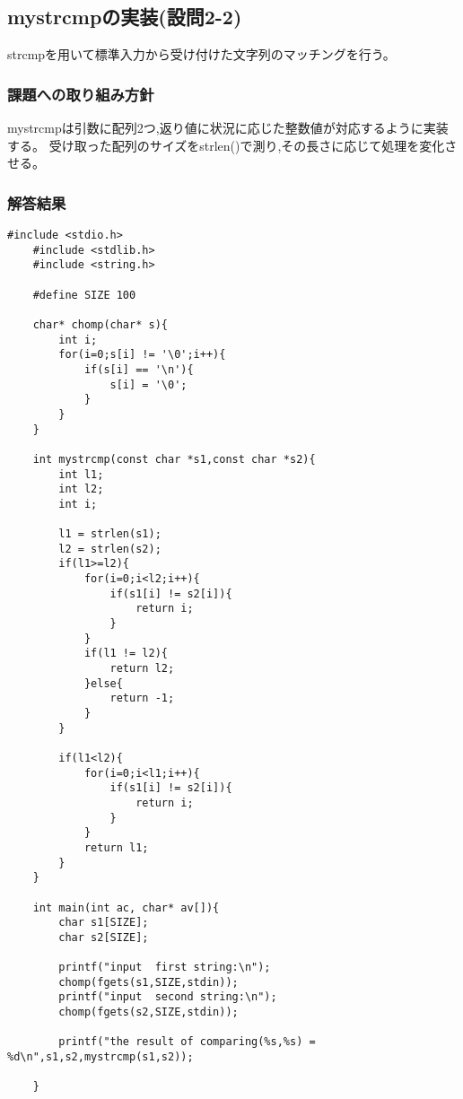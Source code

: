 \documentclass[fontsize = 10pt, paper= a4,twocolumn,column_gap=3zw]{jlreq}
\begin{document}
\subsection{mystrcmpの実装(設問2-2)}
strcmpを用いて標準入力から受け付けた文字列のマッチングを行う。
\subsubsection{課題への取り組み方針}
mystrcmpは引数に配列2つ,返り値に状況に応じた整数値が対応するように実装する。
受け取った配列のサイズをstrlen()で測り,その長さに応じて処理を変化させる。
\subsubsection{解答結果}

\begin{lstlisting}[basicstyle=\ttfamily\footnotesize, frame=single, caption=s2212022-2-2.c,label=s2212022-2-2.c]
    #include <stdio.h>
    #include <stdlib.h>
    #include <string.h>
    
    #define SIZE 100
    
    char* chomp(char* s){
        int i;
        for(i=0;s[i] != '\0';i++){
            if(s[i] == '\n'){
                s[i] = '\0';
            }
        }
    }
    
    int mystrcmp(const char *s1,const char *s2){
        int l1;
        int l2;
        int i;
    
        l1 = strlen(s1);
        l2 = strlen(s2);
        if(l1>=l2){
            for(i=0;i<l2;i++){
                if(s1[i] != s2[i]){
                    return i;
                }
            }
            if(l1 != l2){
                return l2;
            }else{
                return -1;
            }
        }
    
        if(l1<l2){
            for(i=0;i<l1;i++){
                if(s1[i] != s2[i]){
                    return i;
                }
            }
            return l1;
        }
    }
    
    int main(int ac, char* av[]){
        char s1[SIZE];
        char s2[SIZE];
    
        printf("input  first string:\n");
        chomp(fgets(s1,SIZE,stdin));
        printf("input  second string:\n");
        chomp(fgets(s2,SIZE,stdin));
    
        printf("the result of comparing(%s,%s) = %d\n",s1,s2,mystrcmp(s1,s2));
       
    } 
\end{lstlisting}
\end{document}
